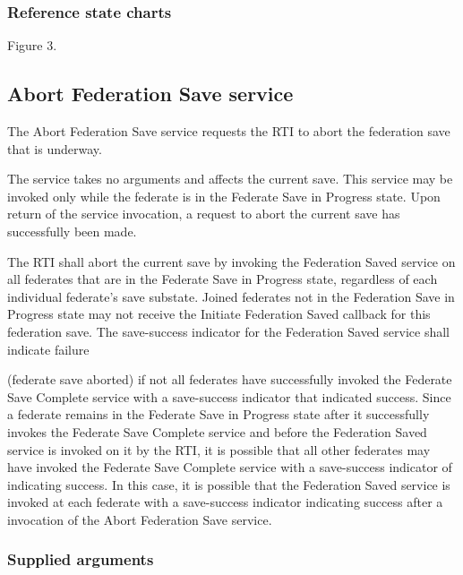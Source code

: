 \subsubsection{Reference state charts}

\begin{stdalphalist}
    \item Figure 3.
\end{stdalphalist}

\subsection{Abort Federation Save service}

The Abort Federation Save service requests the RTI to abort the federation save that is underway.

The service takes no arguments and affects the current save. This service may be invoked only while the federate is in the Federate Save in Progress state. Upon return of the service invocation, a request to abort the current save has successfully been made.

The RTI shall abort the current save by invoking the Federation Saved \rtiinitiated{} service on all federates that are in the Federate Save in Progress state, regardless of each individual federate's save substate. Joined federates not in the Federation Save in Progress state may not receive the Initiate Federation Saved \rtiinitiated{} callback for this federation save. The save-success indicator for the Federation Saved \rtiinitiated{} service shall indicate failure

\clearpage

(federate save aborted) if not all federates have successfully invoked the Federate Save Complete service with a save-success indicator that indicated success. Since a federate remains in the Federate Save in Progress state after it successfully invokes the Federate Save Complete service and before the Federation Saved \rtiinitiated{} service is invoked on it by the RTI, it is possible that all other federates may have invoked the Federate Save Complete service with a save-success indicator of indicating success. In this case, it is possible that the Federation Saved \rtiinitiated{} service is invoked at each federate with a save-success indicator indicating success after a invocation of the Abort Federation Save service.

\subsubsection{Supplied arguments}

